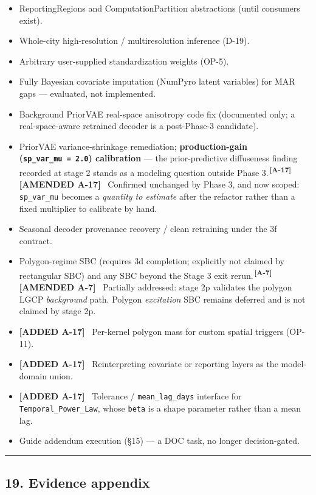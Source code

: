 \documentclass[
  10pt,
]{article}
\providecommand{\tightlist}{%
  \setlength{\itemsep}{0pt}\setlength{\parskip}{0pt}}
\newcommand{\amdref}[1]{{\color{amdcolor}\textsuperscript{\,\textbf{[#1]}}}}
\newcommand{\amd}[1]{{\color{amdcolor}\footnotesize\textbf{[AMENDED #1]}}\ }
\newcommand{\amdnew}[1]{{\color{amdcolor}\footnotesize\textbf{[ADDED #1]}}\ }
\begin{document}
\begin{itemize}
\tightlist
\item
  ReportingRegions and ComputationPartition abstractions (until consumers exist).
\item
  Whole-city high-resolution / multiresolution inference (D-19).
\item
  Arbitrary user-supplied standardization weights (OP-5).
\item
  Fully Bayesian covariate imputation (NumPyro latent variables) for MAR gaps --- evaluated, not implemented.
\item
  Background PriorVAE real-space anisotropy code fix (documented only; a real-space-aware retrained decoder is a post-Phase-3 candidate).
\item
  PriorVAE variance-shrinkage remediation; \textbf{production-gain (\texttt{sp\_var\_mu\ =\ 2.0}) calibration} --- the prior-predictive diffuseness finding recorded at stage 2 stands as a modeling question outside Phase 3.\amdref{A-17} \amd{A-17} Confirmed unchanged by Phase 3, and now scoped: \texttt{sp\_var\_mu} becomes a \emph{quantity to estimate} after the refactor rather than a fixed multiplier to calibrate by hand.
\item
  Seasonal decoder provenance recovery / clean retraining under the 3f contract.
\item
  Polygon-regime SBC (requires 3d completion; explicitly not claimed by rectangular SBC) and any SBC beyond the Stage 3 exit rerun.\amdref{A-7} \amd{A-7} Partially addressed: stage 2p validates the polygon LGCP \emph{background} path. Polygon \emph{excitation} SBC remains deferred and is not claimed by stage 2p.
\item
  \amdnew{A-17} Per-kernel polygon mass for custom spatial triggers (OP-11).
\item
  \amdnew{A-17} Reinterpreting covariate or reporting layers as the model-domain union.
\item
  \amdnew{A-17} Tolerance / \texttt{mean\_lag\_days} interface for \texttt{Temporal\_Power\_Law}, whose \texttt{beta} is a shape parameter rather than a mean lag.
\item
  Guide addendum execution (§15) --- a DOC task, no longer decision-gated.
\end{itemize}

\begin{center}\rule{0.5\linewidth}{0.5pt}\end{center}

\hypertarget{evidence-appendix}{%
\subsection{19. Evidence appendix}\label{evidence-appendix}}
\end{document}
